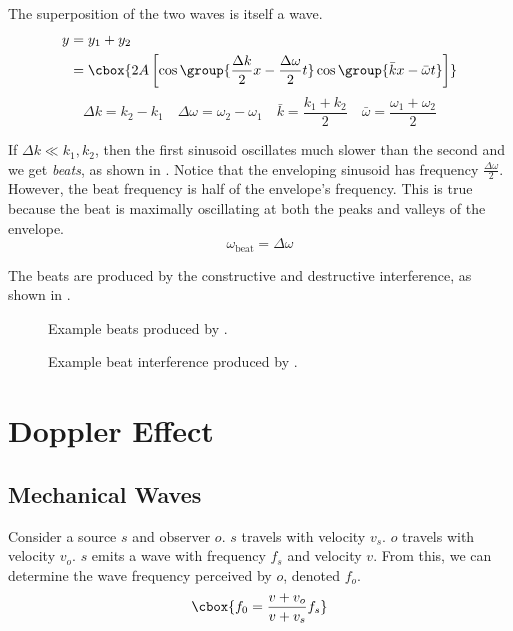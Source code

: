 \documentclass{hw}
\numberwithin{equation}{section}
\begin{document}
The superposition of the two waves is itself a wave.
\begin{align}
  y &= y_1 + y_2 \\
    &= \cbox{%
       2A \left[
        \cos\group{%
          \frac{\Delta k}{2}x - \frac{\Delta \omega}{2}t
        } 
        \cos\group{%
          \bar{k}x - \bar{\omega}t
        } 
      \right]
      }
\end{align}
\begin{equation}
  \Delta k = k_2 - k_1                         \quad 
  \Delta \omega = \omega_2 - \omega_1          \quad
  \bar{k} = \frac{k_1 + k_2}{2}                \quad
  \bar{\omega} = \frac{\omega_1 + \omega_2}{2} 
\end{equation}

If $\Delta k \ll k_1, k_2$, then the first sinusoid oscillates much slower than
the second and we get \emph{beats}, as shown in . Notice that the
enveloping sinusoid has frequency $\frac{\Delta \omega}{2}$. However, the beat
frequency is half of the envelope's frequency. This is true because the beat is
maximally oscillating at both the peaks and valleys of the envelope.
\begin{equation}
  \omega_{\text{beat}} = \Delta \omega
\end{equation}

The beats are produced by the constructive and destructive interference, as
shown in .

\begin{figure}[ht]
  \centering
  \resizebox{\textwidth}{!}{}
  \caption{Example beats produced by .}
  \label{fig:beats}
\end{figure}

\begin{figure}[ht]
  \centering
  \resizebox{\textwidth}{!}{}
  \caption{Example beat interference produced by .}
  \label{fig:beats-interference}
\end{figure}

\section{Doppler Effect}
\subsection{Mechanical Waves}
Consider a source $s$ and observer $o$. $s$ travels with velocity $v_s$. $o$
travels with velocity $v_o$. $s$ emits a wave with frequency $f_s$ and velocity
$v$. From this, we can determine the wave frequency perceived by $o$, denoted
$f_o$.
\begin{equation}\label{eq:doppler}
\cbox{%
  f_0 = \frac{v + v_o}{v + v_s} f_s
}
\end{equation}
\end{document}
